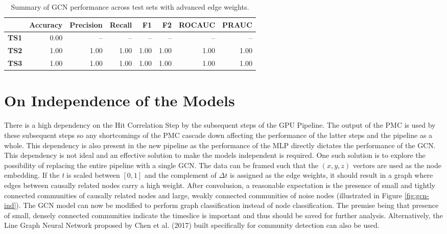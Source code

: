 \begin{table}[htb]
  \centering
  \caption{Summary of GCN performance across test sets with advanced
    edge weights.}
  \begin{tabular}{lrrrrrrr}
    \hline
    & Accuracy & Precision & Recall & F1 & F2 & ROCAUC & PRAUC \\
    \hline
    \textbf{TS1} & 0.00 & -- & -- & -- & -- & -- & -- \\
    \textbf{TS2} & 1.00 & 1.00 & 1.00 & 1.00 & 1.00 & 1.00 & 1.00 \\
    \textbf{TS3} & 1.00 & 1.00 & 1.00 & 1.00 & 1.00 & 1.00 & 1.00 \\
    \hline
  \end{tabular}
  \label{tab:gcn-results-adv}
\end{table}

\section{On Independence of the Models}
There is a high dependency on the Hit Correlation Step by the
subsequent steps of the GPU Pipeline. The output of the PMC is used by
these subsequent steps so any shortcomings of the PMC cascade down
affecting the performance of the latter steps and the pipeline as a
whole. This dependency is also present in the new pipeline as the
performance of the MLP directly dictates the performance of the GCN.
This dependency is not ideal and an effective solution to make the
models independent is required. One such solution is to explore the
possibility of replacing the entire pipeline with a single GCN. The
data can be framed such that the $(x, y, z)$ vectors are used as the
node embedding. If the \emph{t} is scaled between $[0, 1]$ and the
complement of $\Delta t$ is assigned as the edge weights, it should
result in a graph where edges between causally related nodes carry a
high weight. After convolusion, a reasonable expectation is the
presence of small and tightly connected communities of causally
related nodes and large, weakly connected communities of noise nodes
(illustrated in Figure \ref{fig:gcn-ind}). The GCN model can now be
modified to perform graph classification \cite{zhang2018end} instead
of node classification. The premise being that presence of small,
densely connected communities indicate the timeslice is important and
thus should be saved for further analysis. Alternatively, the Line
Graph Neural Network proposed by Chen et al. (2017) built specifically
for community detection can also be used.


